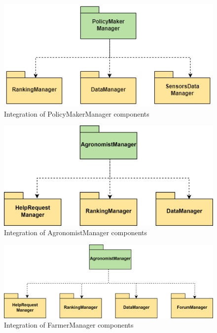 \documentclass[table, 12pt]{article}
\begin{document}
\begin{figure}[H]
    \centering
    \includegraphics[scale=0.5, center]{assets/Test/pmTest.png}
    \caption{Integration of PolicyMakerManager components}
    \label{fig: integration_PolicyMakerManager}
\end{figure}
\begin{figure}[H]
    \centering
    \includegraphics[scale=0.5, center]{assets/Test/agroTest.png}
    \caption{Integration of AgronomistManager components}
    \label{fig: integration_AgronomistManager}
\end{figure}
\begin{figure}[H]
    \centering
    \includegraphics[scale=0.5, center]{assets/Test/farmerTest.png}
    \caption{Integration of FarmerManager components}
    \label{fig: integration_FarmerManager}
\end{figure}
\end{document}
